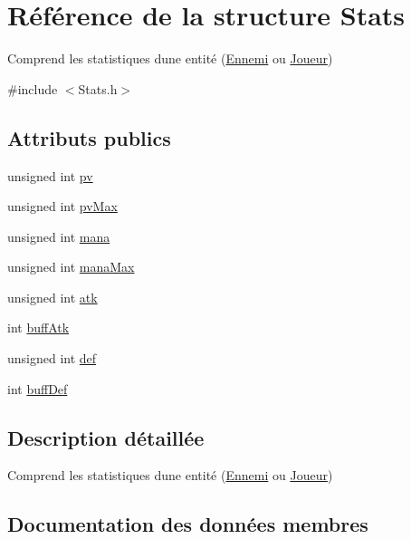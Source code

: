 \hypertarget{structStats}{}\section{Référence de la structure Stats}
\label{structStats}


Comprend les statistiques d\textquotesingle{}une entité (\mbox{\hyperlink{classEnnemi}{Ennemi}} ou \mbox{\hyperlink{classJoueur}{Joueur}})  




{\ttfamily \#include $<$Stats.\+h$>$}

\subsection*{Attributs publics}
\begin{DoxyCompactItemize}
\item 
unsigned int \mbox{\hyperlink{structStats_a1c5b71cc5cf5a331316fd8c29d89543c}{pv}}
\item 
unsigned int \mbox{\hyperlink{structStats_a726bf4ece79dacd7ea3efc78843c6fdc}{pv\+Max}}
\item 
unsigned int \mbox{\hyperlink{structStats_abc64c659cb31cc29124bd55bd089d385}{mana}}
\item 
unsigned int \mbox{\hyperlink{structStats_a8df4032690c2c14ec4669c997baa7624}{mana\+Max}}
\item 
unsigned int \mbox{\hyperlink{structStats_ab7c86676daffc8b4db20f9af44baf912}{atk}}
\item 
int \mbox{\hyperlink{structStats_a5e823290d5a71ec78c6fc1ae777f96a6}{buff\+Atk}}
\item 
unsigned int \mbox{\hyperlink{structStats_a87c330097a4b5399d1c2f00826299fc1}{def}}
\item 
int \mbox{\hyperlink{structStats_afbd2cc1240efa91f1a0577576c7c1699}{buff\+Def}}
\end{DoxyCompactItemize}


\subsection{Description détaillée}
Comprend les statistiques d\textquotesingle{}une entité (\mbox{\hyperlink{classEnnemi}{Ennemi}} ou \mbox{\hyperlink{classJoueur}{Joueur}}) 

\subsection{Documentation des données membres}
\mbox{\label{structStats_ab7c86676daffc8b4db20f9af44baf912}} 

